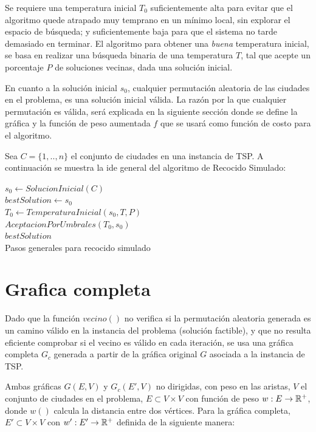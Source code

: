 \documentclass[12pt, letterpaper]{article}
\begin{document}
Se requiere una temperatura inicial $T_0$ suficientemente alta para evitar que el algoritmo quede atrapado muy temprano en un mínimo local, sin explorar el espacio de búsqueda; y suficientemente baja para que el sistema no tarde demasiado en terminar. El algoritmo para obtener una \textit{buena} temperatura inicial, se basa en realizar una búsqueda binaria de una temperatura $T$, tal que acepte un porcentaje $P$ de soluciones vecinas, dada una solución inicial.
\par
En cuanto a la solución inicial $s_0$, cualquier permutación aleatoria de las ciudades en el problema, es una solución inicial válida. La razón por la que cualquier permutación es válida, será explicada en la siguiente sección donde se define la gráfica y la función de peso aumentada $f$ que se usará como función de costo para el algoritmo.
\bigskip
\par
Sea $C=\{1,..,n\}$ el conjunto de ciudades en una instancia de TSP. A continuación se muestra la ide general del algoritmo de Recocido Simulado:

\bigskip
\begin{algorithm}[H]
$s_0 \gets SolucionInicial(C)$\\
$bestSolution \gets s_0$\\
$T_0 \gets TemperaturaInicial(s_0, T, P)$\\
$AceptacionPorUmbrales(T_0, s_0)$\\
\Return $bestSolution$\\
\caption{Pasos generales para recocido simulado}
\label{proc:4}
\end{algorithm}
\LinesNotNumbered
\bigskip

\section{Grafica completa}
\label{sec:1}
Dado que la función $vecino()$ no verifica si la permutación aleatoria generada es un camino válido en la instancia del problema (solución factible), y que no resulta eficiente comprobar si el vecino es válido en cada iteración, se usa una gráfica completa $G_c$ generada a partir de la gráfica original $G$ asociada a la instancia de TSP.
\par
Ambas gráficas $G(E, V)$ y $G_c(E',V)$ no dirigidas, con peso en las aristas, $V$ el conjunto de ciudades en el problema, $E \subset V\times V$ con función de peso $w: E \to \mathbb{R}^+$, donde $w()$ calcula la distancia entre dos vértices. Para la gráfica completa, $E' \subset V \times V$ con $w': E'\to\mathbb{R}^+$ definida de la siguiente manera:
\end{document}
